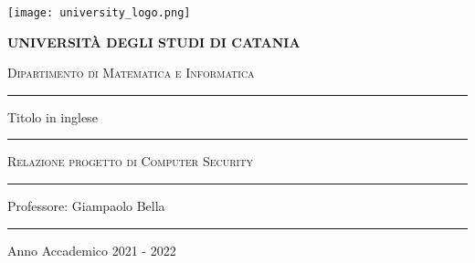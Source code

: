 \begin{titlepage}
    \centering
    \texttt{[image: university\_logo.png]}

    \bigskip

    {\Large \textbf{UNIVERSITÀ DEGLI STUDI DI CATANIA}}

    {\scshape
        \large
        Dipartimento di Matematica e Informatica
    }

    \bigskip

    \hrule

    \bigskip
    \bigskip
    \bigskip
    \bigskip

    {\itshape
        \large
        \@author
        \par}

    \bigskip
    \bigskip
    \bigskip
    \bigskip

    {\centering
        \Large
        \@title
        \par}
    \vspace{5mm}
    {\centering
        Titolo in inglese
        \par}

    \bigskip
    \bigskip
    \bigskip
    \bigskip
    \bigskip
    \bigskip

    \begin{minipage}[b]{8 cm}
        \hrule
        \bigskip
        {\centering\scshape
            Relazione progetto di Computer Security
            \par}
        \bigskip
        \hrule
    \end{minipage}

    \bigskip
    \bigskip
    \bigskip
    \bigskip
    \bigskip
    \bigskip
    \bigskip
    \bigskip
    \bigskip
    \bigskip
    \bigskip

    {\raggedleft
        Professore: Giampaolo Bella
        \par}

    \bigskip
    \bigskip
    \bigskip
    \bigskip

    \vfill

    \hrule

    \bigskip

    {\centering
        Anno Accademico 2021 - 2022
        \par}

\end{titlepage}